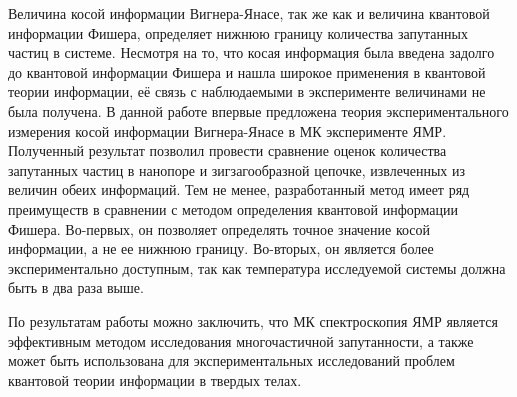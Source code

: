 Величина косой информации Вигнера-Янасе,
так же как и величина квантовой информации Фишера,
определяет нижнюю границу количества запутанных частиц в системе.
Несмотря на то, что косая информация была введена задолго до квантовой информации Фишера
и нашла широкое применения в квантовой теории информации,
её связь с наблюдаемыми в эксперименте величинами не была получена.
В данной работе впервые предложена теория экспериментального измерения косой информации Вигнера-Янасе
в МК эксперименте ЯМР.
Полученный результат позволил провести сравнение оценок количества запутанных частиц в нанопоре и зигзагообразной цепочке,
извлеченных из величин обеих информаций.
Тем не менее, разработанный метод имеет ряд преимуществ в сравнении с методом определения квантовой информации Фишера.
Во-первых, он позволяет определять точное значение косой информации, а не ее нижнюю границу.
Во-вторых, он является более экспериментально доступным, так как температура исследуемой системы должна быть в два раза выше.


По результатам работы можно заключить,
что МК спектроскопия ЯМР является эффективным методом исследования многочастичной запутанности,
а также может быть использована для экспериментальных исследований проблем квантовой теории информации в твердых телах.
